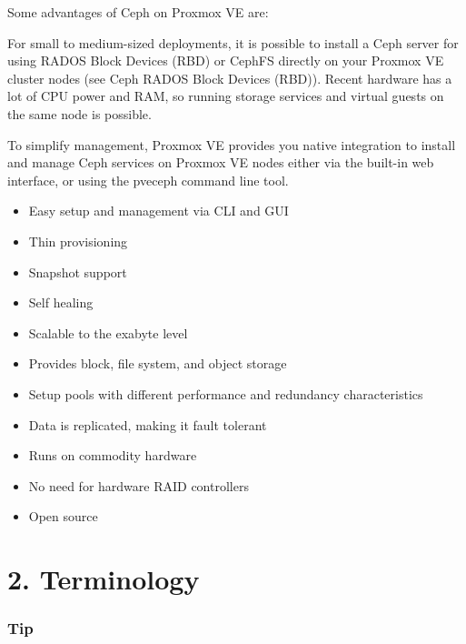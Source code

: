 Some advantages of Ceph on Proxmox VE are:

For small to medium-sized deployments, it is possible to install a Ceph server for using RADOS Block Devices (RBD) or CephFS directly on your Proxmox VE cluster nodes (see Ceph RADOS Block Devices (RBD)). Recent hardware has a lot of CPU power and RAM, so running storage services and virtual guests on the same node is possible.

To simplify management, Proxmox VE provides you native integration to install and manage Ceph services on Proxmox VE nodes either via the built-in web interface, or using the pveceph command line tool.

\begin{itemize}[leftmargin=2cm]

	\item Easy setup and management via CLI and GUI

	\item Thin provisioning

	\item Snapshot support

	\item Self healing

	\item Scalable to the exabyte level

	\item Provides block, file system, and object storage

	\item Setup pools with different performance and redundancy characteristics

	\item Data is replicated, making it fault tolerant

	\item Runs on commodity hardware

	\item No need for hardware RAID controllers

	\item Open source

\end{itemize}


\section{2. Terminology}

\subsubsection{Tip}

